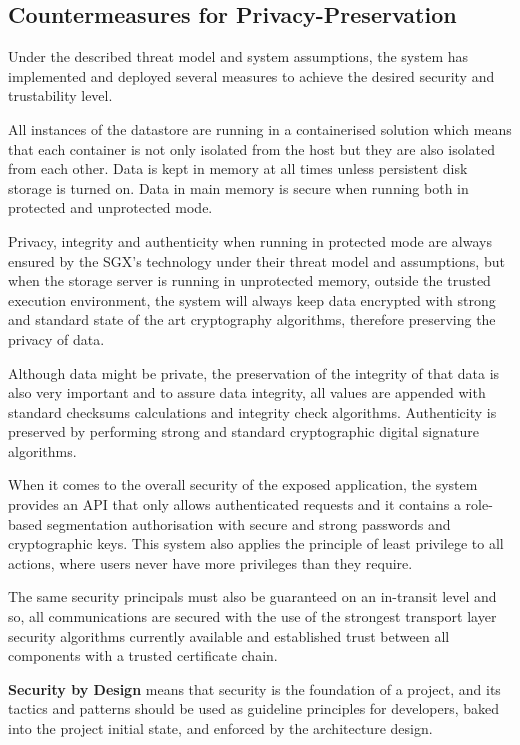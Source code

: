 \subsection{Countermeasures for Privacy-Preservation}
\label{ssec:contermeaseures_for_privacy_preservation}

Under the described threat model and system assumptions, the system has implemented and deployed several measures to achieve the desired security and trustability level.

All instances of the datastore are running in a containerised solution which means that each container is not only isolated from the host but they are also isolated from each other. Data is kept in memory at all times unless persistent disk storage is turned on. Data in main memory is secure when running both in protected and unprotected mode. 

Privacy, integrity and authenticity when running in protected mode are always ensured by the \gls{SGX}'s technology under their threat model and assumptions, but when the storage server is running in unprotected memory, outside the trusted execution environment, the system will always keep data encrypted with strong and standard state of the art cryptography algorithms, therefore preserving the privacy of data. 

Although data might be private, the preservation of the integrity of that data is also very important and to assure data integrity, all values are appended with standard checksums calculations and integrity check algorithms. Authenticity is preserved by performing strong and standard cryptographic digital signature algorithms.

When it comes to the overall security of the exposed application, the system provides an \gls{API} that only allows authenticated requests and it contains a role-based segmentation authorisation with secure and strong passwords and cryptographic keys. This system also applies the principle of least privilege \cite{polp:1} to all actions, where users never have more privileges than they require.

The same security principals must also be guaranteed on an in-transit level and so, all communications are secured with the use of the strongest transport layer security algorithms currently available and established trust between all components with a trusted certificate chain.

\textbf{Security by Design} means that security is the foundation of a project, and its tactics and patterns should be used as guideline principles for developers, baked into the project initial state, and enforced by the architecture design.


